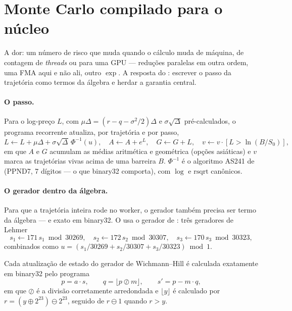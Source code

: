 \section{Monte Carlo compilado para o núcleo}\label{sec:fin-mc}

A dor: um número de risco que muda quando o cálculo muda de máquina, de contagem de \textit{threads} ou para uma GPU --- reduções paralelas em outra ordem, uma FMA aqui e não ali, outro $\exp$. A resposta do \vapor{}: escrever o passo da trajetória como termos da álgebra e herdar a garantia central.

\paragraph{O passo.} Para o log-preço $L$, com $\mu\Delta = (r - q - \sigma^2/2)\Delta$ e $\sigma\sqrt{\Delta}$ pré-calculados, o programa recorrente atualiza, por trajetória e por passo,
\begin{equation}
  L \leftarrow L + \mu\Delta + \sigma\sqrt{\Delta}\,\Phi^{-1}(u), \quad A \leftarrow A + e^{L}, \quad G \leftarrow G + L, \quad v \leftarrow v \cdot [L > \ln(B/S_0)],
  \label{eq:passo-mc}
\end{equation}
em que $A$ e $G$ acumulam as médias aritmética e geométrica (opções asiáticas) e $v$ marca as trajetórias vivas acima de uma barreira $B$. $\Phi^{-1}$ é o algoritmo AS241 de  (PPND7, 7 dígitos --- o que binary32 comporta), com $\log$ e $\mathrm{rsqrt}$ canônicos.

\paragraph{O gerador dentro da álgebra.} Para que a trajetória inteira rode no worker, o gerador também precisa ser termo da álgebra --- e exato em binary32. O \vapor{} usa o gerador de : três geradores de Lehmer
\begin{equation}
  s_1 \leftarrow 171\, s_1 \bmod 30269, \quad s_2 \leftarrow 172\, s_2 \bmod 30307, \quad s_3 \leftarrow 170\, s_3 \bmod 30323,
\end{equation}
combinados como $u = (s_1/30269 + s_2/30307 + s_3/30323) \bmod 1$.

\begin{proposicao}\label{prop:wh}
Cada atualização de estado do gerador de Wichmann--Hill é calculada exatamente em binary32 pelo programa
\[
p = a \cdot s,\qquad q = \lfloor p \oslash m \rfloor,\qquad s' = p - m \cdot q,
\]
em que $\oslash$ é a divisão corretamente arredondada e $\lfloor y \rfloor$ é calculado por $r = (y \oplus 2^{23}) \ominus 2^{23}$, seguido de $r \ominus 1$ quando $r > y$.
\end{proposicao}

